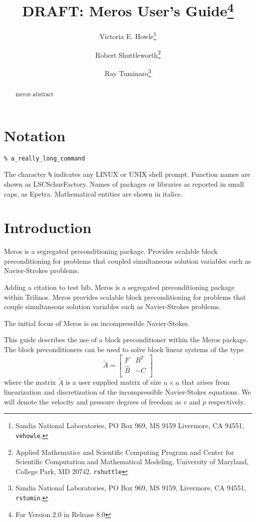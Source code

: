 \documentclass[oneeqnum,onefignum,onetabnum,10pt]{SANDreport}
\title{DRAFT: Meros User's Guide\footnote{For \MerosTM{} Version 2.0 in
\TrilinosTM{} Release 8.0}}
\author{
Victoria E. Howle\thanks{Sandia National Laboratories, PO Box 969, MS 9159
    Livermore, CA 94551, {\tt vehowle}\protect@{\tt sandia.gov}.}
  \and
  Robert Shuttleworth\thanks{Applied Mathematics and Scientific Computing Program and Center for Scientific
Computation and Mathematical Modeling,
University of Maryland, College Park, MD 20742. {\tt rshuttle}\protect@{\tt math.umd.edu}}
  \and
  Ray Tuminaro\thanks{Sandia National Laboratories, PO Box 969, MS 9159,
    Livermore, CA 94551, {\tt rstumin}\protect@{\tt sandia.gov}.}
}
\date{}
\begin{document}
\maketitle
\begin{abstract}
meros abstract
\end{abstract}






\SANDmain

\clearpage
\tableofcontents

%
\section{Notation}
\begin{verbatim} 
% a_really_long_command 
\end{verbatim}
The character \verb!%! indicates any LINUX or UNIX shell prompt.
Function names are shown as {\sf LSCSchurFactory}.  Names of packages
or libraries as reported in small caps, as {\sc Epetra}. Mathematical
entities are shown in italics.


\section{Introduction}
Meros is a segregated preconditioning package. Provides scalable block
preconditioning for problems that coupled simultaneous solution
variables such as Navier-Strokes problems. 


Adding a citation to test bib\cite{ElmanSilvesterWathen.book}.  Meros
is a segregated preconditioning package within Trilinos. Meros
provides scalable block preconditioning for problems that couple
simultaneous solution variables such as Navier-Strokes problems.

The initial focus of Meros is on incompressible Navier-Stokes.

This guide describes the use of a block preconditioner within the
Meros package.  The block preconditioners can be used to solve block
linear systems of the type
\begin{equation}
\label{E:blocks}
\tilde{A} =
\begin{bmatrix}
F & B^T \\
\hat{B} & -C \\
\end{bmatrix}
\end{equation}
where the matrix $\tilde{A}$ is a user supplied matrix of size $n
\times n$ that arises from linearization and discretization of the
incompressible Navier-Stokes equations.  We will denote the velocity
and pressure degrees of freedom as $v$ and $p$ respectively.
\end{document}
